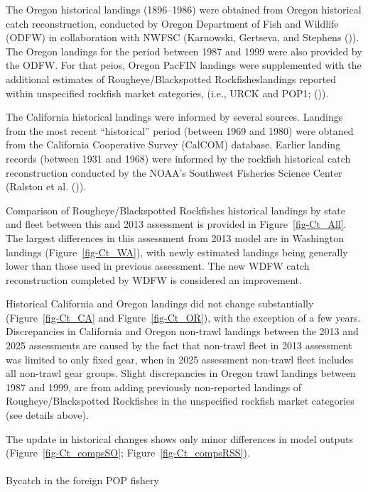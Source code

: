 \documentclass[
]{scrartcl}
\makeatletter
\let\oldparagraph\paragraph
\renewcommand{\paragraph}{
    \@ifstar
      \xxxParagraphStar
      \xxxParagraphNoStar
  }
\newcommand{\xxxParagraphStar}[1]{\oldparagraph*{#1}\mbox{}}
\newcommand{\xxxParagraphNoStar}[1]{\oldparagraph{#1}\mbox{}}
\makeatother
\begin{document}
The Oregon historical landings (1896--1986) were obtained from Oregon
historical catch reconstruction, conducted by Oregon Department of Fish
and Wildlife (ODFW) in collaboration with NWFSC (Karnowski, Gertseva,
and Stephens ()). The
Oregon landings for the period between 1987 and 1999 were also provided
by the ODFW. For that peios, Oregon PacFIN landings were supplemented
with the additional estimates of Rougheye/Blackspotted
Rockfisheslandings reported within unspecified rockfish market
categories, (i.e., URCK and POP1;
()).

The California historical landings were informed by several sources.
Landings from the most recent ``historical'' period (between 1969 and
1980) were obtaned from the California Cooperative Survey (CalCOM)
database. Earlier landing records (between 1931 and 1968) were informed
by the rockfish historical catch reconstruction conducted by the NOAA's
Southwest Fisheries Science Center (Ralston et al.
()).

Comparison of Rougheye/Blackspotted Rockfishes historical landings by
state and fleet between this and 2013 assessment is provided in
Figure~\ref{fig-Ct_All}. The largest differences in this assessment from
2013 model are in Washington landings (Figure~\ref{fig-Ct_WA}), with
newly estimated landings being generally lower than those used in
previous assessment. The new WDFW catch reconstruction completed by WDFW
is considered an improvement.

Historical California and Oregon landings did not change substantially
(Figure~\ref{fig-Ct_CA} and Figure~\ref{fig-Ct_OR}), with the exception
of a few years. Discrepancies in California and Oregon non-trawl
landings between the 2013 and 2025 assessments are caused by the fact
that non-trawl fleet in 2013 assessment was limited to only fixed gear,
when in 2025 assessment non-trawl fleet includes all non-trawl gear
groups. Slight discrepancies in Oregon trawl landings between 1987 and
1999, are from adding previously non-reported landings of
Rougheye/Blackspotted Rockfishes in the unspecified rockfish market
categories (see details above).

The update in historical changes shows only minor differences in model
outputs (Figure~\ref{fig-Ct_compsSO}; Figure~\ref{fig-Ct_compsRSS}).

\paragraph{Bycatch in the foreign POP
fishery}\label{bycatch-in-the-foreign-pop-fishery}
\end{document}
